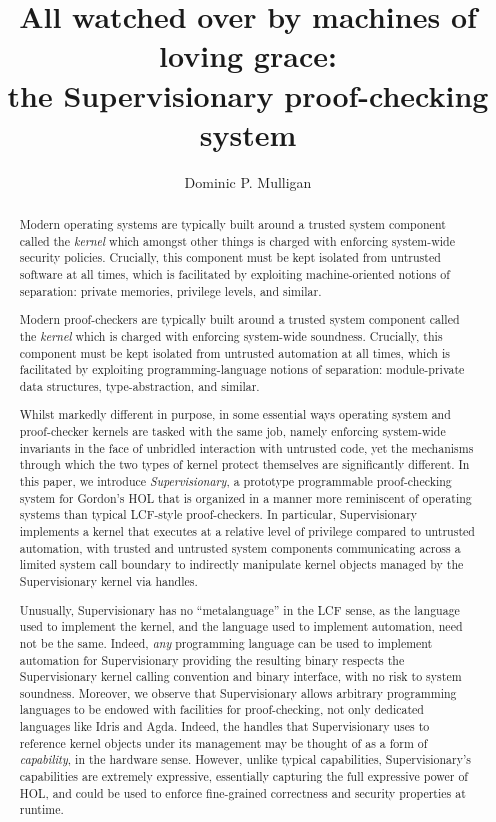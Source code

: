 \documentclass[a4paper, UKenglish, cleveref, autoref, thm-restate]{lipics-v2021}
\title{All watched over by machines of loving grace:\\the Supervisionary proof-checking system}
\author{Dominic P. Mulligan}{Automated Reasoning Group, Amazon Web Services\footnote{All work done whilst at Arm Research} \and \url{www.dominic-mulligan.co.uk}}{dominic.p.mulligan@gmail.com}{}{}
\begin{document}
\maketitle

\begin{abstract}
Modern operating systems are typically built around a trusted system component called the \emph{kernel} which amongst other things is charged with enforcing system-wide security policies.
Crucially, this component must be kept isolated from untrusted software at all times, which is facilitated by exploiting machine-oriented notions of separation: private memories, privilege levels, and similar.

Modern proof-checkers are typically built around a trusted system component called the \emph{kernel} which is charged with enforcing system-wide soundness.
Crucially, this component must be kept isolated from untrusted automation at all times, which is facilitated by exploiting programming-language notions of separation: module-private data structures, type-abstraction, and similar.

Whilst markedly different in purpose, in some essential ways operating system and proof-checker kernels are tasked with the same job, namely enforcing system-wide invariants in the face of unbridled interaction with untrusted code, yet the mechanisms through which the two types of kernel protect themselves are significantly different.
In this paper, we introduce \emph{Supervisionary}, a prototype programmable proof-checking system for Gordon's HOL that is organized in a manner more reminiscent of operating systems than typical LCF-style proof-checkers.
In particular, Supervisionary implements a kernel that executes at a relative level of privilege compared to untrusted automation, with trusted and untrusted system components communicating across a limited system call boundary to indirectly manipulate kernel objects managed by the Supervisionary kernel via handles.

Unusually, Supervisionary has no ``metalanguage'' in the LCF sense, as the language used to implement the kernel, and the language used to implement automation, need not be the same.
Indeed, \emph{any} programming language can be used to implement automation for Supervisionary providing the resulting binary respects the Supervisionary kernel calling convention and binary interface, with no risk to system soundness.
Moreover, we observe that Supervisionary allows arbitrary programming languages to be endowed with facilities for proof-checking, not only dedicated languages like Idris and Agda.
Indeed, the handles that Supervisionary uses to reference kernel objects under its management may be thought of as a form of \emph{capability}, in the hardware sense.
However, unlike typical capabilities, Supervisionary's capabilities are extremely expressive, essentially capturing the full expressive power of HOL, and could be used to enforce fine-grained correctness and security properties at runtime.
\end{abstract}
\end{document}
